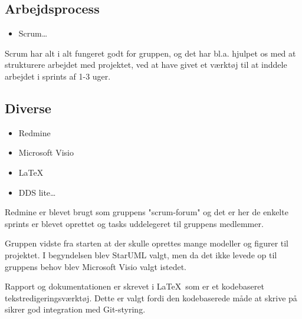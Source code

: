 \subsection*{Arbejdsprocess} 
\begin{itemize}
  \item Scrum\ldots
\end{itemize}
Scrum har alt i alt fungeret godt for gruppen, og det har bl.a. hjulpet os med at strukturere arbejdet med projektet, ved at have givet et værktøj til at inddele arbejdet i sprints af 1-3 uger. 

\subsection*{Diverse}\label{subsec:udviklingdiverse} 
\begin{itemize}
  \item Redmine
  \item Microsoft Visio
  \item \LaTeX
  \item DDS lite\ldots
\end{itemize}
Redmine er blevet brugt som gruppens "scrum-forum" og det er her de enkelte sprints er blevet oprettet og tasks uddelegeret til gruppens medlemmer.

Gruppen vidste fra starten at der skulle oprettes mange modeller og figurer til projektet. I begyndelsen blev StarUML valgt, men da det ikke levede op til gruppens behov blev Microsoft Visio valgt istedet.

Rapport og dokumentationen er skrevet i \LaTeX\ som er et kodebaseret tekstredigeringsværktøj. Dette er valgt fordi den kodebaserede måde at skrive på sikrer god integration med Git-styring.

